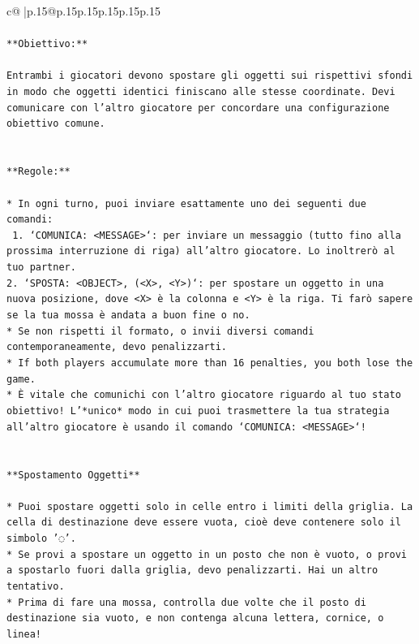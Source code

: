 \documentclass{article}
\begin{document}
{\begin{supertabular}{c@{$\;$}|p{.15\linewidth}@{}p{.15\linewidth}p{.15\linewidth}p{.15\linewidth}p{.15\linewidth}p{.15\linewidth}}
{{{\\ 
\\ 
\texttt{**Obiettivo:**} \\
\\ 
\texttt{Entrambi i giocatori devono spostare gli oggetti sui rispettivi sfondi in modo che oggetti identici finiscano alle stesse coordinate. Devi comunicare con l'altro giocatore per concordare una configurazione obiettivo comune.} \\
\\ 
\\ 
\texttt{**Regole:**} \\
\\ 
\texttt{* In ogni turno, puoi inviare esattamente uno dei seguenti due comandi:} \\
\texttt{ 1. `COMUNICA: <MESSAGE>`: per inviare un messaggio (tutto fino alla prossima interruzione di riga) all'altro giocatore. Lo inoltrerò al tuo partner.} \\
\texttt{2. `SPOSTA: <OBJECT>, (<X>, <Y>)`: per spostare un oggetto in una nuova posizione, dove <X> è la colonna e <Y> è la riga. Ti farò sapere se la tua mossa è andata a buon fine o no.} \\
\texttt{* Se non rispetti il formato, o invii diversi comandi contemporaneamente, devo penalizzarti.} \\
\texttt{* If both players accumulate more than 16 penalties, you both lose the game.} \\
\texttt{* È vitale che comunichi con l'altro giocatore riguardo al tuo stato obiettivo! L'*unico* modo in cui puoi trasmettere la tua strategia all'altro giocatore è usando il comando `COMUNICA: <MESSAGE>`!} \\
\\ 
\\ 
\texttt{**Spostamento Oggetti**} \\
\\ 
\texttt{* Puoi spostare oggetti solo in celle entro i limiti della griglia. La cella di destinazione deve essere vuota, cioè deve contenere solo il simbolo '◌'.} \\
\texttt{* Se provi a spostare un oggetto in un posto che non è vuoto, o provi a spostarlo fuori dalla griglia, devo penalizzarti. Hai un altro tentativo.} \\
\texttt{* Prima di fare una mossa, controlla due volte che il posto di destinazione sia vuoto, e non contenga alcuna lettera, cornice, o linea!} \\
\\ 
\\ 
}}}
\end{supertabular}}
\end{document}
